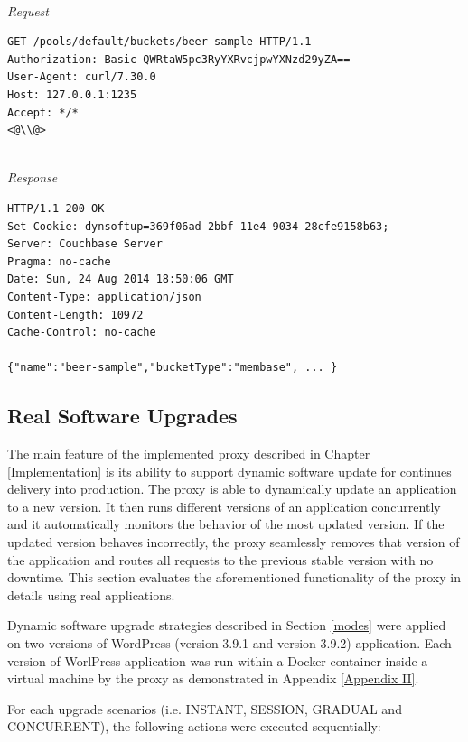 \documentclass[a4paper,11pt,twoside]{report}
\begin{document}
\noindent\\
\textit{Request}
\begin{lstlisting}[language=terminal]
GET /pools/default/buckets/beer-sample HTTP/1.1
Authorization: Basic QWRtaW5pc3RyYXRvcjpwYXNzd29yZA==
User-Agent: curl/7.30.0
Host: 127.0.0.1:1235
Accept: */*
<@\\@>
\end{lstlisting}

\noindent\\
\textit{Response}
\begin{lstlisting}[language=terminal]
HTTP/1.1 200 OK
Set-Cookie: dynsoftup=369f06ad-2bbf-11e4-9034-28cfe9158b63;
Server: Couchbase Server
Pragma: no-cache
Date: Sun, 24 Aug 2014 18:50:06 GMT
Content-Type: application/json
Content-Length: 10972
Cache-Control: no-cache

{"name":"beer-sample","bucketType":"membase", ... }
\end{lstlisting}

\subsection{Real Software Upgrades}
The main feature of the implemented proxy described in Chapter \ref{Implementation} is its ability to support dynamic software update for continues delivery into production. The proxy is able to dynamically update an application to a new version. It then runs different versions of an application concurrently and it automatically monitors the behavior of the most updated version. If the updated version behaves incorrectly, the proxy seamlessly removes that version of the application and routes all requests to the previous stable version with no downtime. This section evaluates the aforementioned functionality of the proxy in details using real applications.

Dynamic software upgrade strategies described in Section \ref{modes} were applied on two versions of WordPress (version 3.9.1 and version 3.9.2) application. Each version of WorlPress application was run within a Docker container inside a virtual machine by the proxy as demonstrated in Appendix \ref{Appendix II}.

For each upgrade scenarios (i.e. INSTANT, SESSION, GRADUAL and CONCURRENT), the following actions were executed sequentially:
\end{document}
